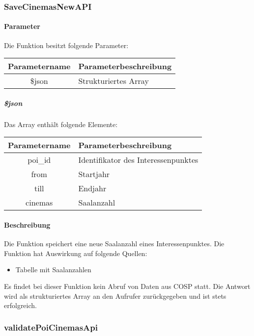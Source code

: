 \subsubsection{SaveCinemasNewAPI}
\paragraph{Parameter} Die Funktion besitzt folgende Parameter:
\begin{table}[H]
	\begin{tabular}{|c|p{11cm}|}
		\hline
		\textbf{Parametername} & \textbf{Parameterbeschreibung} \\ \hline
		\$json & Strukturiertes Array \\ \hline
	\end{tabular}
\end{table}
\subparagraph{\$json}Das Array enthält folgende Elemente:
\begin{table}[H]
	\begin{tabular}{|c|p{11cm}|}
		\hline
		\textbf{Parametername} & \textbf{Parameterbeschreibung} \\ \hline
		poi\_id  & Identifikator des Interessenpunktes \\ \hline
		from     & Startjahr \\ \hline
		till     & Endjahr \\ \hline
		cinemas  & Saalanzahl \\ \hline
	\end{tabular}
\end{table}
\paragraph{Beschreibung} Die Funktion speichert eine neue Saalanzahl eines Interessenpunktes. Die Funktion hat Auswirkung auf folgende Quellen:
\begin{itemize}
	\item Tabelle mit Saalanzahlen
\end{itemize}
Es findet bei dieser Funktion kein Abruf von Daten aus {\glqq COSP\grqq} statt. Die Antwort wird als strukturiertes Array an den Aufrufer zurückgegeben und ist stets erfolgreich.
\subsubsection{validatePoiCinemasApi}
